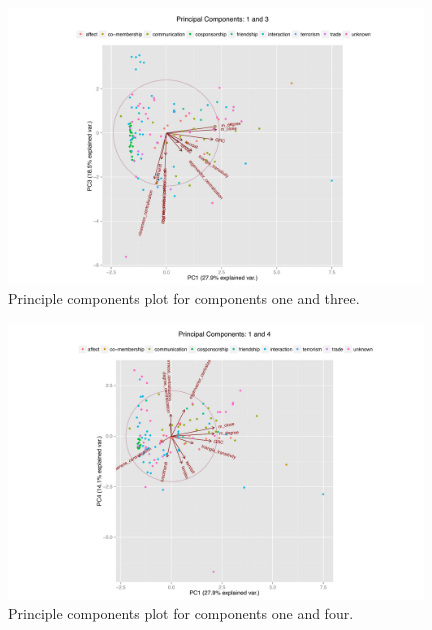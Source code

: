 \documentclass[3p,times]{elsarticle}
\begin{document}
\begin{figure}
\begin{center}
	\caption{\label{fig:1 and 3} Principle components plot for components one and three.}
		\includegraphics[width = 0.98\textwidth]{./images/Observed_PCA_Components1_3.pdf}
\end{center}
\end{figure}

\begin{figure}
\begin{center}
	\caption{\label{fig:1 and 4} Principle components plot for components one and four.}
		\includegraphics[width = 0.98\textwidth]{./images/Observed_PCA_Components1_4.pdf}
\end{center}
\end{figure}
\end{document}
